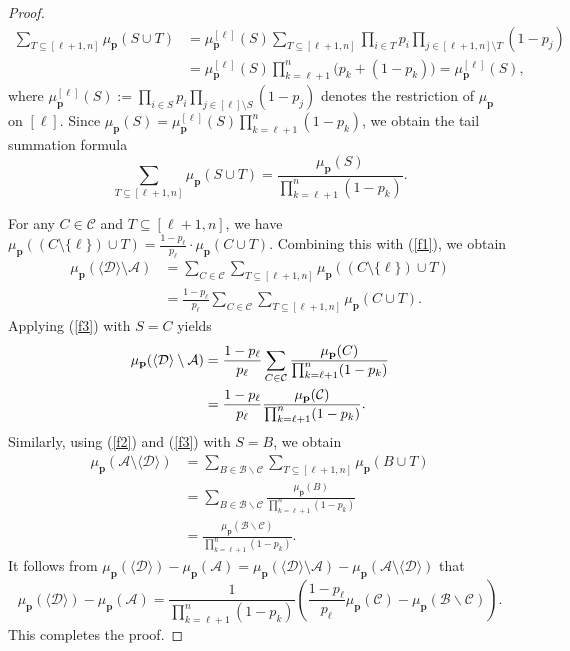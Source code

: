\documentclass[10pt,a4paper]{amsart}
\begin{document}
\begin{proof}
\begin{align*}
\sum_{T \subseteq [\ell+1,n]} \mu_{\mathbf{p}}(S \cup T)
&=
\mu_{\mathbf{p}}^{[\ell]}(S) 
\sum_{T \subseteq [\ell+1,n]} 
\prod_{i \in T} p_i \prod_{j \in [\ell+1,n] \setminus T} (1-p_j) \\
&=
\mu_{\mathbf{p}}^{[\ell]}(S) 
\prod_{k=\ell+1}^n \big( p_k + (1-p_k) \big) =
\mu_{\mathbf{p}}^{[\ell]}(S),
\end{align*}
where $\mu_{\mathbf{p}}^{[\ell]}(S) := \prod_{i \in S} p_i \prod_{j \in [\ell]\setminus S} (1-p_j)$ denotes the restriction of $\mu_{\mathbf{p}}$ on $[\ell]$. Since $\mu_{\mathbf{p}}(S) = \mu_{\mathbf{p}}^{[\ell]}(S) \prod_{k=\ell+1}^n (1-p_k)$, we obtain the tail summation formula
\begin{equation}
\sum_{T \subseteq [\ell+1,n]} \mu_{\mathbf{p}}(S \cup T)
=
\frac{\mu_{\mathbf{p}}(S)}{\prod_{k=\ell+1}^n (1-p_k)}. \label{f3}
\end{equation}

For any $C \in \mathcal{C}$ and  $T \subseteq [\ell+1,n]$, we have
$
\mu_{\mathbf{p}}((C \setminus \{\ell\}) \cup T)
=
\frac{1-p_\ell}{p_\ell} \cdot \mu_{\mathbf{p}}(C \cup T). 
$
Combining this with (\ref{f1}), we obtain
\begin{align*}
\mu_{\mathbf{p}}(\langle \mathcal{D} \rangle \setminus \mathcal{A})
&=
\sum_{C \in \mathcal{C}} \sum_{T \subseteq [\ell+1,n]} 
\mu_{\mathbf{p}}((C \setminus \{\ell\}) \cup T) \\
&=
\frac{1-p_\ell}{p_\ell} 
\sum_{C \in \mathcal{C}} \sum_{T \subseteq [\ell+1,n]} 
\mu_{\mathbf{p}}(C \cup T).
\end{align*}
Applying (\ref{f3}) with $S = C$ yields
\begin{align*}
\mu_{\mathbf{p}}(\langle \mathcal{D} \rangle \setminus \mathcal{A})
&=
\frac{1-p_\ell}{p_\ell}
\sum_{C \in \mathcal{C}} 
\frac{\mu_{\mathbf{p}}(C)}{\prod_{k=\ell+1}^n (1-p_k)} \notag\\
&=
\frac{1-p_\ell}{p_\ell}
\frac{\mu_{\mathbf{p}}( \mathcal{C} )}{\prod_{k=\ell+1}^n (1-p_k)}.
\end{align*}
Similarly, using   (\ref{f2}) and (\ref{f3})  with $S = B$, we obtain
\begin{align*}
\mu_{\mathbf{p}}(\mathcal{A} \setminus \langle \mathcal{D} \rangle)
&=
\sum_{B \in \mathcal{B}\backslash \mathcal{C}} \sum_{T \subseteq [\ell+1,n]} 
\mu_{\mathbf{p}}(B \cup T) \\
&=
\sum_{B \in \mathcal{B}\backslash \mathcal{C}} 
\frac{\mu_{\mathbf{p}}(B)}{\prod_{k=\ell+1}^n (1-p_k)} \\
&=
\frac{\mu_{\mathbf{p}}(\mathcal{B}\backslash \mathcal{C} )}{\prod_{k=\ell+1}^n (1-p_k)}.
\end{align*}
It follows from 
$
\mu_{\mathbf{p}}(\langle \mathcal{D} \rangle) - \mu_{\mathbf{p}}(\mathcal{A})
=
\mu_{\mathbf{p}}(\langle \mathcal{D} \rangle \setminus \mathcal{A}) - \mu_{\mathbf{p}}(\mathcal{A} \setminus \langle \mathcal{D} \rangle)
$
that
$$
\mu_{\mathbf{p}}(\langle \mathcal{D} \rangle) - \mu_{\mathbf{p}}(\mathcal{A})
=
\frac{1}{\prod_{k=\ell+1}^n (1-p_k)} \left(
\frac{1-p_\ell}{p_\ell}  \mu_{\mathbf{p}}( \mathcal{C}) - \mu_{\mathbf{p}}( \mathcal{B}\backslash \mathcal{C})
\right).
$$
This completes the proof. 
\end{proof}
\end{document}
